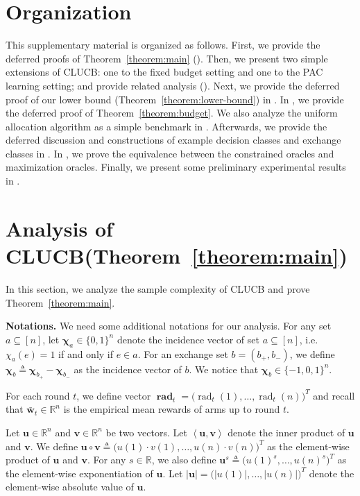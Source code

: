 \documentclass{article}
\newcommand{\Algorithm}{{\small \textsf{CLUCB}}\xspace}
\newcommand{\RR}{\mathbb R}
\DeclareMathOperator{\rad}{rad}
\newcommand{\inn}[1]{\left\langle #1 \right\rangle}
\renewcommand{\vec}[1]{\boldsymbol{#1}}
\renewcommand{\odot}{\circ}
\begin{document}
\maketitle

\section*{Organization}
This supplementary material is organized as follows.
First, we provide the deferred proofs of Theorem~\ref{theorem:main} ().
Then, we present two simple extensions of \Algorithm: one to the fixed budget setting and one to the PAC learning setting; and provide related analysis ().
Next, we provide the deferred proof of our lower bound (Theorem~\ref{theorem:lower-bound}) in .
In , we provide the deferred proof of Theorem~\ref{theorem:budget}.
We also analyze the uniform allocation algorithm as a simple benchmark in .
Afterwards, we provide the deferred discussion and constructions of example decision classes and exchange classes in . 
In , we prove the equivalence between the constrained oracles and maximization oracles.
Finally, we present some preliminary experimental results in .


\section{Analysis of \Algorithm (Theorem~\ref{theorem:main})}
\label{section:proof-algorithm}

In this section, we analyze the sample complexity of \Algorithm and prove Theorem~\ref{theorem:main}.

\textbf{Notations.} 
We need some additional notations for our analysis.
For any set $a\subseteq [n]$, let $\vec \chi_a \in \{0,1\}^n$ denote the incidence vector of set $a \subseteq [n]$, i.e. $\chi_a(e) = 1$ if and only if $e\in a$.
For an exchange set $b=(b_+,b_-)$, we define $\vec \chi_b \triangleq \vec \chi_{b_+}- \vec \chi_{b_-}$ as the incidence vector of $b$.
We notice that $\vec \chi_b \in \{-1,0,1\}^n$.

For each round $t$, we define vector $\vec\rad_t = \big(\rad_t(1),\ldots,\rad_t(n)\big)^T$ and recall that $\vec {\bar w}_t\in \RR^n$ is the empirical mean rewards of arms up to round $t$.

Let $\vec u\in \RR^n$ and $\vec v\in \RR^n$ be two vectors.
Let $\inn{\vec u, \vec v}$ denote the inner product of $\vec u$ and $\vec v$.
We define $\vec u \odot \vec v \triangleq \big(u(1)\cdot v(1),\ldots,u(n)\cdot v(n)\big)^T$ as the element-wise product of $\vec u$ and $\vec v$.
For any $s\in \RR$, we also define $\vec u^s \triangleq \big(u(1)^s, \ldots, u(n)^s)^T$ as the element-wise exponentiation of $\vec u$.
Let $|\vec u| = \big(|u(1)|, \ldots, |u(n)|\big)^T$ denote the element-wise absolute value of $\vec u$.
\end{document}
